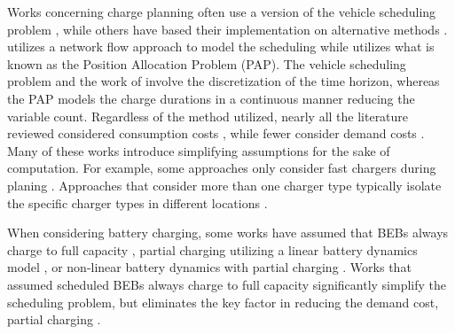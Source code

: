 \documentclass[energies,article,submit,moreauthors]{Definitions/mdpi}
\begin{document}
Works concerning charge planning often use a version of the vehicle scheduling problem \cite{zhang-2021-optim-elect,duan-2021-refor-mixed,rinaldi-2020-mixed-fleet,tang-2019-robus-sched,li-2014-trans-bus,he-2020-optim-charg},
while others have based their implementation on alternative methods
\cite{qarebagh-2019-optim-sched,whitaker-2023-a-network}. \cite{whitaker-2023-a-network} utilizes a network flow
approach to model the scheduling while \cite{qarebagh-2019-optim-sched} utilizes what is known as the Position
Allocation Problem (PAP). The vehicle scheduling problem and the work of \cite{whitaker-2023-a-network} involve the
discretization of the time horizon, whereas the PAP models the charge durations in a continuous manner reducing the
variable count. Regardless of the method utilized, nearly all the literature reviewed considered consumption costs
\cite{jahic-2019-preem,frendo-2021-open-sourc,qin-2016-numer-analy,zhou-2020-bi-objec,duan-2021-refor-mixed,mortensen-2023-cost-minim,zhou-2020-collab-optim,rinaldi-2020-mixed-fleet,zhou-2020-collab-optim}, while fewer
consider demand costs \cite{jahic-2019-preem,frendo-2021-open-sourc,qin-2016-numer-analy,mortensen-2023-cost-minim,he-2020-optim-charg}. Many of these works introduce simplifying assumptions for the sake of
computation. For example, some approaches only consider fast chargers during planing \cite{zhou-2020-collab-optim,li-2014-trans-bus,wang-2017-optim-rechar,sebastiani-2016-evaluat-elect,wei-2018-optim-spatio}. Approaches that
consider more than one charger type typically isolate the specific charger types in different locations
\cite{tang-2019-robus-sched,he-2020-optim-charg}.

When considering battery charging, some works have assumed that BEBs always charge to full capacity
\cite{duan-2021-refor-mixed,zhang-2021-optim-elect,zhou-2020-bi-objec,wang-2017-elect-vehic}, partial charging
utilizing a linear battery dynamics model \cite{wei-2018-optim-spatio,he-2020-optim-charg,mortensen-2023-cost-minim}, or non-linear battery dynamics with partial charging \cite{whitaker-2023-a-network,zhang-2021-optim-elect,qin-2016-numer-analy,jahic-2019-preem,frendo-2021-open-sourc}. Works that assumed
scheduled BEBs always charge to full capacity significantly simplify the scheduling problem, but eliminates the key
factor in reducing the demand cost, partial charging \cite{tang-2019-robus-sched,duan-2021-refor-mixed,rinaldi-2020-mixed-fleet,zhou-2020-collab-optim}.
\end{document}
